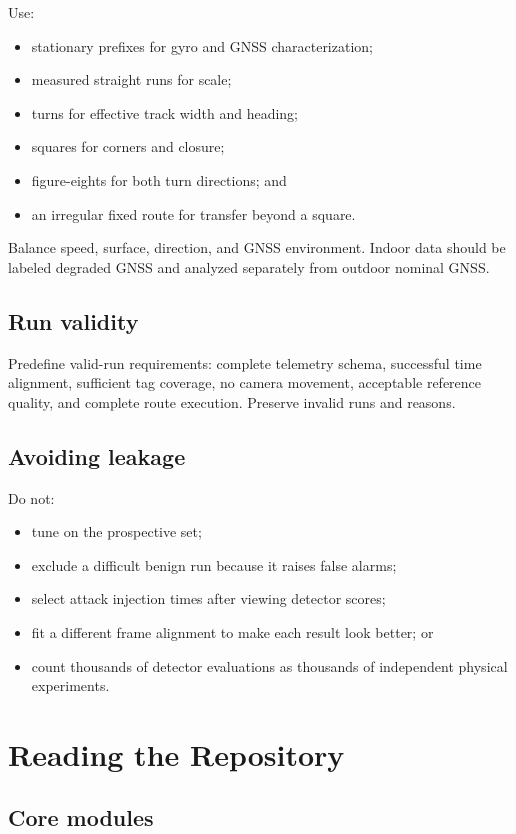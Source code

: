 \documentclass[11pt,oneside]{book}
\begin{document}
Use:
\begin{itemize}
  \item stationary prefixes for gyro and GNSS characterization;
  \item measured straight runs for scale;
  \item turns for effective track width and heading;
  \item squares for corners and closure;
  \item figure-eights for both turn directions; and
  \item an irregular fixed route for transfer beyond a square.
\end{itemize}

Balance speed, surface, direction, and GNSS environment. Indoor data should be
labeled degraded GNSS and analyzed separately from outdoor nominal GNSS.

\section{Run validity}

Predefine valid-run requirements: complete telemetry schema, successful time
alignment, sufficient tag coverage, no camera movement, acceptable reference
quality, and complete route execution. Preserve invalid runs and reasons.

\section{Avoiding leakage}

Do not:
\begin{itemize}
  \item tune on the prospective set;
  \item exclude a difficult benign run because it raises false alarms;
  \item select attack injection times after viewing detector scores;
  \item fit a different frame alignment to make each result look better; or
  \item count thousands of detector evaluations as thousands of independent
  physical experiments.
\end{itemize}

\chapter{Reading the Repository}

\section{Core modules}
\end{document}

